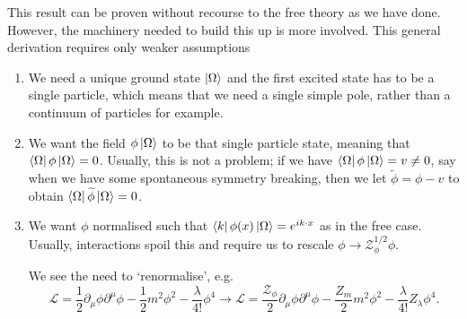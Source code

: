 This result can be proven without recourse to the free theory as we have done. However, the machinery needed to build this up is more involved.
This general derivation requires only weaker assumptions
\begin{enumerate}[1)]
  \item We need a unique ground state $\ket{\Omega}$ and the first excited state has to be a single particle, which means that we need a single simple pole, rather than a continuum of particles for example.
  \item We want the field $\phi \ket{\Omega}$ to be that single particle state, meaning that $ \bra{\Omega} \phi \ket{\Omega} = 0$.
    Usually, this is not a problem; if we have $\bra{\Omega} \phi \ket{\Omega} = v \neq 0$, say when we have some spontaneous symmetry breaking, then we let $\widetilde{\phi} = \phi - v$ to obtain $\bra{\Omega} \widetilde{\phi} \ket{ \Omega} = 0$.
  \item We want $\phi$ normalised such that $\bra{k} \phi(x) \ket{\Omega} = e^{i k \cdot x}$ as in the free case.
    Usually, interactions spoil this and require us to rescale $\phi \to \mathcal{Z}_\phi^{1 / 2} \phi$.

    We see the need to `renormalise', e.g.
    \begin{equation}
      \mathscr{L} = \frac{1}{2} \partial_{\mu} \phi \partial^{\mu} \phi - \frac{1}{2} m^2 \phi^2 - \frac{\lambda}{4!} \phi^4 \to 
      \mathscr{L} = \frac{\mathcal{Z}_\phi}{2} \partial_{\mu} \phi \partial^{\mu} \phi - \frac{Z_m}{2} m^2 \phi^2 - \frac{\lambda}{4!} Z_\lambda \phi^4.
    \end{equation}
\end{enumerate}
